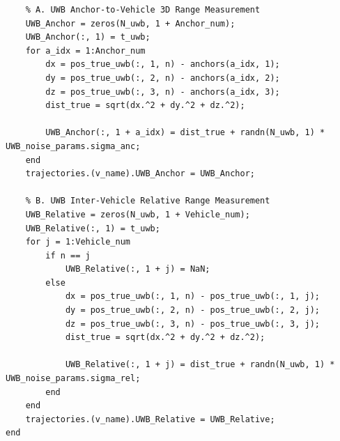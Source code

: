 \documentclass[twocolumn,10pt]{article}
\begin{document}
\begin{lstlisting}
    % A. UWB Anchor-to-Vehicle 3D Range Measurement
    UWB_Anchor = zeros(N_uwb, 1 + Anchor_num);
    UWB_Anchor(:, 1) = t_uwb;
    for a_idx = 1:Anchor_num
        dx = pos_true_uwb(:, 1, n) - anchors(a_idx, 1);
        dy = pos_true_uwb(:, 2, n) - anchors(a_idx, 2);
        dz = pos_true_uwb(:, 3, n) - anchors(a_idx, 3);
        dist_true = sqrt(dx.^2 + dy.^2 + dz.^2);
        
        UWB_Anchor(:, 1 + a_idx) = dist_true + randn(N_uwb, 1) * UWB_noise_params.sigma_anc;
    end
    trajectories.(v_name).UWB_Anchor = UWB_Anchor;
    
    % B. UWB Inter-Vehicle Relative Range Measurement
    UWB_Relative = zeros(N_uwb, 1 + Vehicle_num);
    UWB_Relative(:, 1) = t_uwb;
    for j = 1:Vehicle_num
        if n == j
            UWB_Relative(:, 1 + j) = NaN;
        else
            dx = pos_true_uwb(:, 1, n) - pos_true_uwb(:, 1, j);
            dy = pos_true_uwb(:, 2, n) - pos_true_uwb(:, 2, j);
            dz = pos_true_uwb(:, 3, n) - pos_true_uwb(:, 3, j);
            dist_true = sqrt(dx.^2 + dy.^2 + dz.^2);
            
            UWB_Relative(:, 1 + j) = dist_true + randn(N_uwb, 1) * UWB_noise_params.sigma_rel;
        end
    end
    trajectories.(v_name).UWB_Relative = UWB_Relative;
end
\end{lstlisting}
\end{document}
